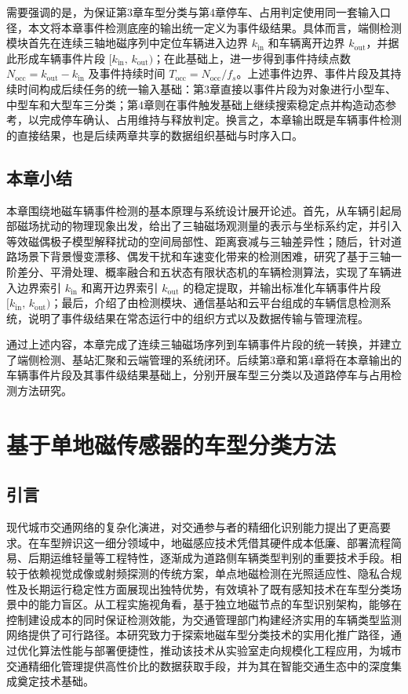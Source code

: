\documentclass{xdupgthesis}
\providecommand{\FloatBarrier}{}
\begin{document}
需要强调的是，为保证第3章车型分类与第4章停车、占用判定使用同一套输入口径，本文将本章事件检测底座的输出统一定义为事件级结果。具体而言，端侧检测模块首先在连续三轴地磁序列中定位车辆进入边界 $k_{\mathrm{in}}$ 和车辆离开边界 $k_{\mathrm{out}}$，并据此形成车辆事件片段 $[k_{\mathrm{in}},\,k_{\mathrm{out}})$；在此基础上，进一步得到事件持续点数 $N_{\mathrm{occ}}=k_{\mathrm{out}}-k_{\mathrm{in}}$ 及事件持续时间 $T_{\mathrm{occ}}=N_{\mathrm{occ}}/f_s$。上述事件边界、事件片段及其持续时间构成后续任务的统一输入基础：第3章直接以事件片段为对象进行小型车、中型车和大型车三分类；第4章则在事件触发基础上继续搜索稳定点并构造动态参考，以完成停车确认、占用维持与释放判定。换言之，本章输出既是车辆事件检测的直接结果，也是后续两章共享的数据组织基础与时序入口。

\FloatBarrier

\section{本章小结}
\label{sec:ch2_summary}

本章围绕地磁车辆事件检测的基本原理与系统设计展开论述。首先，从车辆引起局部磁场扰动的物理现象出发，给出了三轴磁场观测量的表示与坐标系约定，并引入等效磁偶极子模型解释扰动的空间局部性、距离衰减与三轴差异性；随后，针对道路场景下背景慢变漂移、偶发干扰和车速变化带来的检测困难，研究了基于三轴一阶差分、平滑处理、概率融合和五状态有限状态机的车辆检测算法，实现了车辆进入边界索引 $k_{\mathrm{in}}$ 和离开边界索引 $k_{\mathrm{out}}$ 的稳定提取，并输出标准化车辆事件片段 $[k_{\mathrm{in}},\,k_{\mathrm{out}})$；最后，介绍了由检测模块、通信基站和云平台组成的车辆信息检测系统，说明了事件级结果在常态运行中的组织方式以及数据传输与管理流程。

通过上述内容，本章完成了连续三轴磁场序列到车辆事件片段的统一转换，并建立了端侧检测、基站汇聚和云端管理的系统闭环。后续第3章和第4章将在本章输出的车辆事件片段及其事件级结果基础上，分别开展车型三分类以及道路停车与占用检测方法研究。




\chapter{基于单地磁传感器的车型分类方法}
\label{ch:veh_cls}

\section{引言}
\label{sec:ch3_intro}

现代城市交通网络的复杂化演进，对交通参与者的精细化识别能力提出了更高要求。在车型辨识这一细分领域中，地磁感应技术凭借其硬件成本低廉、部署流程简易、后期运维轻量等工程特性，逐渐成为道路侧车辆类型判别的重要技术手段。相较于依赖视觉成像或射频探测的传统方案，单点地磁检测在光照适应性、隐私合规性及长期运行稳定性方面展现出独特优势，有效填补了既有感知技术在车型分类场景中的能力盲区。从工程实施视角看，基于独立地磁节点的车型识别架构，能够在控制建设成本的同时保证检测效能，为交通管理部门构建经济实用的车辆类型监测网络提供了可行路径。本研究致力于探索地磁车型分类技术的实用化推广路径，通过优化算法性能与部署便捷性，推动该技术从实验室走向规模化工程应用，为城市交通精细化管理提供高性价比的数据获取手段，并为其在智能交通生态中的深度集成奠定技术基础。
\end{document}
